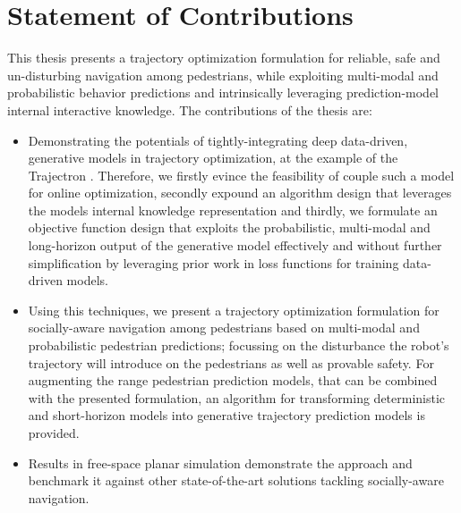 \section{Statement of Contributions}
\label{text:introduction/contributions}
This thesis presents a trajectory optimization formulation for reliable, safe and un-disturbing navigation among pedestrians, while exploiting multi-modal and probabilistic behavior predictions and intrinsically leveraging prediction-model internal interactive knowledge.
\newline\newline
The contributions of the thesis are:

\begin{itemize}
\item Demonstrating the potentials of tightly-integrating deep data-driven, generative models in trajectory optimization, at the example of the Trajectron \cite{Ivanovic2018}\cite{Salzmann2020}. Therefore, we firstly evince the feasibility of couple such a model for online optimization, secondly expound an algorithm design that leverages the models internal knowledge representation and thirdly, we formulate an objective function design that exploits the probabilistic, multi-modal and long-horizon output of the generative model effectively and without further simplification by leveraging prior work in loss functions for training data-driven models.  
\item Using this techniques, we present a trajectory optimization formulation for socially-aware navigation among pedestrians based on multi-modal and probabilistic pedestrian predictions; focussing on the disturbance the robot's trajectory will introduce on the pedestrians as well as provable safety. For augmenting the range pedestrian prediction models, that can be combined with the presented formulation, an algorithm for transforming deterministic and short-horizon models into generative trajectory prediction models is provided.
\item Results in free-space planar simulation demonstrate the approach and benchmark it against other state-of-the-art solutions tackling socially-aware navigation.
\end{itemize}